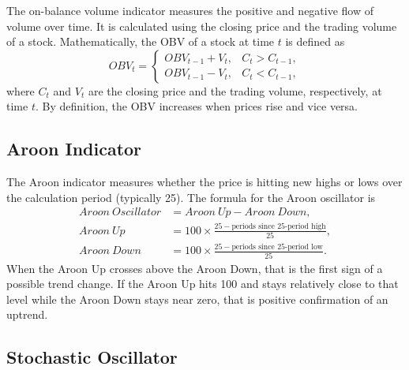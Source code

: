 The on-balance volume indicator measures the positive and negative flow of volume over
time. It is calculated using the closing price and the trading volume of a stock.
Mathematically, the OBV of a stock at time $t$ is defined as
\begin{equation}
  OBV_t =
  \begin{cases}
    OBV_{t-1} + V_t, & C_t > C_{t-1},\\[2pt]
    OBV_{t-1} - V_t, & C_t < C_{t-1},
  \end{cases}
\end{equation}
where $C_t$ and $V_t$ are the closing price and the trading volume, respectively, at time
$t$. By definition, the OBV increases when prices rise and vice versa.

\subsection{Aroon Indicator}

The Aroon indicator measures whether the price is hitting new highs or lows over the
calculation period (typically 25). The formula for the Aroon oscillator is
\begin{align}
  Aroon\ Oscillator &= Aroon\ Up - Aroon\ Down,\\
  Aroon\ Up &= 100\times\frac{25 - \text{periods since 25-period high}}{25},\\
  Aroon\ Down &= 100\times\frac{25 - \text{periods since 25-period low}}{25}.
\end{align}
When the Aroon Up crosses above the Aroon Down, that is the first sign of a possible trend
change. If the Aroon Up hits 100 and stays relatively close to that level while the Aroon
Down stays near zero, that is positive confirmation of an uptrend.

\subsection{Stochastic Oscillator}

